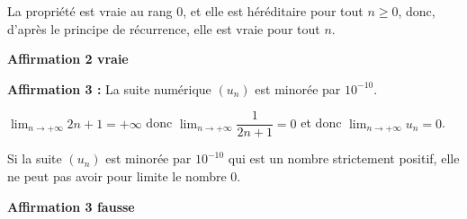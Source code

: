\documentclass[10pt]{article}
\providecommand{\ds}{\displaystyle}
\begin{document}
\begin{list}{\textbullet}{}
\begin{list}{\textbullet}{}
La propriété est vraie au rang $0$, et elle est héréditaire pour tout $n\geqslant 0$, donc, d'après le principe de récurrence, elle est vraie pour tout $n$.
\end{list}

\hfill\textbf{Affirmation 2 vraie}

\item \textbf{Affirmation 3 :} \og{}La suite numérique $\left(u_{n}\right)$ est minorée par $10^{-10}$.\fg{}

$\ds\lim_{n\to +\infty} 2n+1=+\infty$ donc $\ds\lim_{n\to +\infty} \dfrac{1}{2n+1}=0$ et donc $\ds\lim_{n\to +\infty} u_n=0$.

Si la suite $(u_n)$ est minorée par $10^{-10}$ qui est un nombre strictement positif, elle ne peut pas avoir pour limite le nombre 0.

\hfill\textbf{Affirmation 3 fausse}

\end{list}
\end{document}
